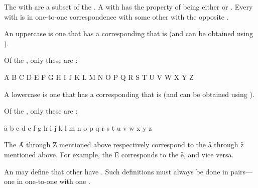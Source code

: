 \endsubsubsection%


The  with  are 
a subset of the  .
A  with  has the property of being either
 or .
Every  with  is in one-to-one correspondence
with some other  with the opposite .



An uppercase  is one that has a corresponding
  that is  
(and can be obtained using ).

Of the , only these are  :

\f{A B C D E F G H I J K L M N O P Q R S T U V W X Y Z}

\endsubsubsubsection%


A lowercase  is one that has a corresponding 
  that is  
(and can be obtained using ).

Of the , only these are  :

\f{a b c d e f g h i j k l m n o p q r s t u v w x y z}

\endsubsubsubsection%


The   \f{A} through \f{Z} mentioned above
respectively correspond to
the   \f{a} through \f{z} mentioned above.
For example, the   \f{E} 
corresponds to the   \f{e}, and vice versa.

\endsubsubsubsection%


An  may define that other 
  have .  Such definitions must always
be done in pairs---one   in one-to-one 
 with one  .

